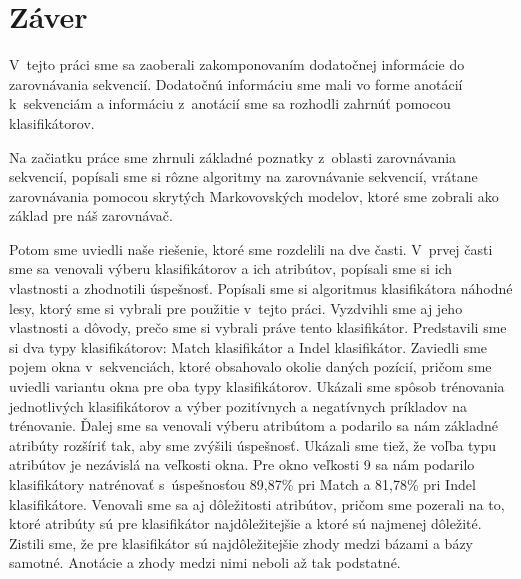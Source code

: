 \chapter*{Záver}

V~tejto práci sme sa zaoberali zakomponovaním dodatočnej informácie do zarovnávania sekvencií. Dodatočnú informáciu sme mali vo forme anotácií k~sekvenciám a informáciu z~anotácií sme sa rozhodli zahrnúť pomocou klasifikátorov.

Na začiatku práce sme zhrnuli základné poznatky z~oblasti zarovnávania sekvencií, popísali sme si rôzne algoritmy na zarovnávanie sekvencií, vrátane zarovnávania pomocou skrytých Markovovských modelov, ktoré sme zobrali ako základ pre náš zarovnávač.

Potom sme uviedli naše riešenie, ktoré sme rozdelili na dve časti.
V~prvej časti sme sa venovali výberu klasifikátorov a ich atribútov, popísali sme si ich vlastnosti a zhodnotili úspešnosť.
Popísali sme si algoritmus klasifikátora náhodné lesy, ktorý sme si vybrali pre použitie v~tejto práci. Vyzdvihli sme aj jeho vlastnosti a dôvody, prečo sme si vybrali práve tento klasifikátor.
Predstavili sme si dva typy klasifikátorov: Match klasifikátor a Indel klasifikátor. Zaviedli sme pojem okna v~sekvenciách, ktoré obsahovalo okolie daných pozícií, pričom sme uviedli variantu okna pre oba typy klasifikátorov.
Ukázali sme spôsob trénovania jednotlivých klasifikátorov a výber pozitívnych a negatívnych príkladov na trénovanie.
Ďalej sme sa venovali výberu atribútom a podarilo sa nám základné atribúty rozšíriť tak, aby sme zvýšili úspešnosť. Ukázali sme tiež, že voľba typu atribútov je nezávislá na veľkosti okna. Pre okno veľkosti 9 sa nám podarilo klasifikátory natrénovať s~úspešnosťou 89,87\% pri Match a 81,78\% pri Indel klasifikátore. Venovali sme sa aj dôležitosti atribútov, pričom sme pozerali na to, ktoré atribúty sú pre klasifikátor najdôležitejšie a ktoré sú najmenej dôležité. Zistili sme, že pre klasifikátor sú najdôležitejšie zhody medzi bázami a bázy samotné. Anotácie a zhody medzi nimi neboli až tak podstatné.

